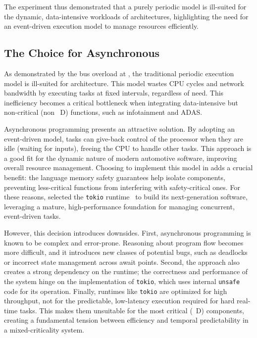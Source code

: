 The experiment thus demonstrated that a purely periodic model is ill-suited for the dynamic,
data-intensive workloads of \sdv architectures, highlighting the need for an event-driven execution
model to manage resources efficiently.

\subsection{The Choice for Asynchronous \Rust}
\label{sec:intro:gap:async_rust}

As demonstrated by the bus overload at \ampere, the traditional periodic execution model is
ill-suited for \sdv architecture. This model wastes CPU cycles and network bandwidth by executing
tasks at fixed intervals, regardless of need. This inefficiency becomes a critical bottleneck when
integrating data-intensive but non-critical (non \Asil~D) functions, such as infotainment and ADAS.

Asynchronous programming presents an attractive solution. By adopting an event-driven model, tasks
can give-back control of the processor when they are idle (\eg waiting for inputs), freeing the CPU
to handle other tasks. This approach is a good fit for the dynamic nature of modern automotive
software, improving overall resource management. Choosing to implement this model in \Rust adds a
crucial benefit: the language memory safety guarantees help isolate components, preventing
less-critical functions from interfering with safety-critical ones. For these reasons, \ampere
selected the \texttt{tokio} runtime~\cite{tokio} to build its next-generation software, leveraging a
mature, high-performance foundation for managing concurrent, event-driven tasks.

However, this decision introduces downsides. First, asynchronous programming is known to be complex
and error-prone. Reasoning about program flow becomes more difficult, and it introduces new classes
of potential bugs, such as deadlocks or incorrect state management across await points. Second, the
approach also creates a strong dependency on the runtime; the correctness and performance of the
system hinge on the implementation of \texttt{tokio}, which uses internal \texttt{unsafe} code for
its operation. Finally, runtimes like \texttt{tokio} are optimized for high throughput, not for the
predictable, low-latency execution required for hard real-time tasks. This makes them unsuitable for
the most critical (\Asil~D) components, creating a fundamental tension between efficiency and
temporal predictability in a mixed-criticality system.

